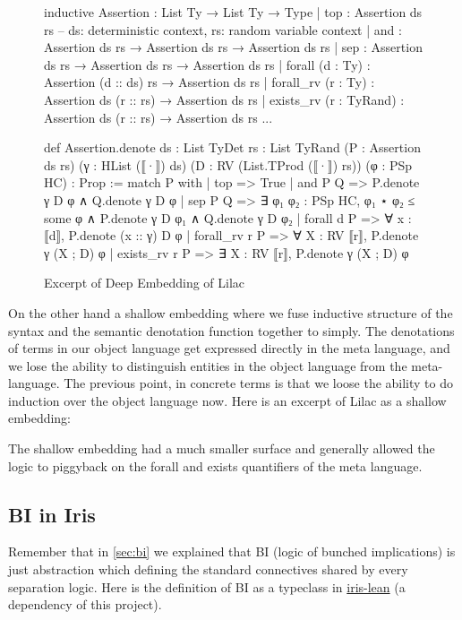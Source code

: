 \begin{figure}[htbp]
  \centering
  \begin{minipage}{0.9\linewidth}
\begin{leancode}
inductive Assertion : List Ty → List Ty → Type
  | top : Assertion ds rs -- ds: deterministic context, rs: random variable context
  | and  : Assertion ds rs  → Assertion ds rs → Assertion ds rs
  | sep  : Assertion ds rs  → Assertion ds rs → Assertion ds rs
  | forall (d : Ty) : Assertion (d :: ds) rs → Assertion ds rs
  | forall_rv (r : Ty) : Assertion ds (r :: rs) → Assertion ds rs
  | exists_rv (r : TyRand) : Assertion ds (r :: rs) → Assertion ds rs
  ...

def Assertion.denote {ds : List TyDet} {rs : List TyRand}
    (P : Assertion ds rs) (γ : HList (⟦·⟧) ds) (D : RV (List.TProd (⟦·⟧) rs)) (φ : PSp HC) : Prop :=
  match P with
  | top  => True
  | and P Q => P.denote γ D φ ∧ Q.denote γ D φ
  | sep P Q => ∃ φ₁ φ₂ : PSp HC, φ₁ ⋆ φ₂ ≤ some φ ∧ P.denote γ D φ₁ ∧ Q.denote γ D φ₂
  | forall d P => ∀ x : ⟦d⟧, P.denote (x :: γ) D φ
  | forall_rv r P => ∀ X : RV ⟦r⟧, P.denote γ (X ; D) φ
  | exists_rv r P => ∃ X : RV ⟦r⟧, P.denote γ (X ; D) φ
\end{leancode}
  \end{minipage}
  \caption{Excerpt of Deep Embedding of Lilac}
  \label{fig:deep-embedding}
\end{figure}


On the other hand a shallow embedding where we fuse inductive structure of the syntax and the semantic denotation function together to simply. The denotations of terms
in our object language get expressed directly in the meta language, and we lose the ability to distinguish entities in the object language from the meta-language. The previous
point, in concrete terms is that we loose the ability to do induction over the object language now. Here is an excerpt of Lilac as a shallow embedding:

\begin{leancode}

\end{leancode}

The shallow embedding had a much smaller surface and generally allowed the logic to piggyback on the forall and exists quantifiers of the meta language. 

\subsection{BI in Iris}
Remember that in \ref{sec:bi} we explained that BI (logic of bunched implications) is just abstraction which defining the standard connectives
shared by every separation logic. Here is the definition of BI as a typeclass in 
\href{https://github.com/leanprover-community/iris-lean/blob/bb24268a8a9b5ddb23224a8c1db66eadd4b9beb7/Iris/Iris/BI/BIBase.lean#L21-L36}{iris-lean} (a dependency of this project).

